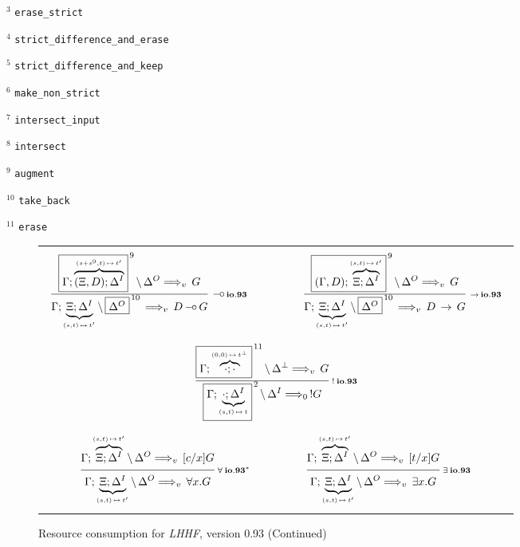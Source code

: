 \bigskip

$^3$ {\tt erase\_strict}

$^4$ {\tt strict\_difference\_and\_erase}

$^5$ {\tt strict\_difference\_and\_keep}

$^6$ {\tt make\_non\_strict}

$^7$ {\tt intersect\_input}

$^8$ {\tt intersect}

$^9$ {\tt augment}

$^{10}$ {\tt take\_back}

$^{11}$ {\tt erase}



\clearpage
\begin{figure}[t]
  \begin{center}
    \leavevmode

    \begin{tabular}{|c|}
      \hline \\

      $\begin{array}{ccc}
        \ruleI
          {\ioIXd
            {\fb{\G;\ob{(\X,D);\D^I}{s+s^9,t}{t'}}{9}}
            {\D^O}{G}{v}}
          {\ioIXd
            {\G;\ub{\X;\D^I}{s,t}{t'}}
            {\fb{\D^O}{10}}{D \Lolli G}{v}}
          {\Lolli io.93}
      &
        \hspace{3em}
      &
        \ruleI
          {\ioIXd
            {\fb{(\G,D);\ob{\X;\D^I}{s,t}{t'}}{9}}
            {\D^O}{G}{v}}
          {\ioIXd
            {\G;\ub{\X;\D^I}{s,t}{t'}}
            {\fb{\D^O}{10}}{D \Imp G}{v}}
          {\Imp io.93}
      \end{array}$

      \\ \\ \\
      $\ruleI
        {\ioIXd
          {\fb{\G;\ob{\cdot;\cdot}{0,0}{t^\Bot}}{11}}
          {\D^\Bot}{G}{v}}
        {\ioIXd
          {\fb{\G;\ub{\cdot;\D^I}{s,t}{t}}{2}}
          {\D^I}{!G}{0}}
        {! \: io.93}$

      \\ \\ \\
      $\begin{array}{ccc}
        \ruleI
          {\ioIXd
            {\G;\ob{\X;\D^I}{s,t}{t'}}
            {\D^O}{[c/x]G}{v}}
          {\ioIXd
            {\G;\ub{\X;\D^I}{s,t}{t'}}
            {\D^O}{\A x. G}{v}}
          {\A \: io.93^*}
      &
        \hspace{3em}
      &
        \ruleI
          {\ioIXd
            {\G;\ob{\X;\D^I}{s,t}{t'}}
            {\D^O}{[t/x]G}{v}}
          {\ioIXd
            {\G;\ub{\X;\D^I}{s,t}{t'}}
            {\D^O}{\E x. G}{v}}
          {\E \: io.93}
      \end{array}$
      \\ \\
      \hline
    \end{tabular}

    \caption{Resource consumption for {\em LHHF}, version 0.93 (Continued)}
    \label{fig:RC_IXd3}
  \end{center}
\end{figure}
